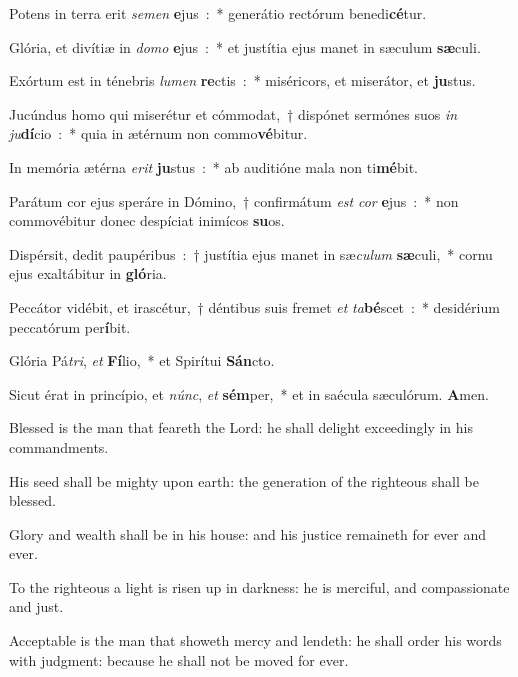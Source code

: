 \documentclass[letterpaper,12pt]{article} %
\begin{document}
\begin{multicols}{2}
\begin{psalmverses}[1]
\item Potens in terra erit\emph{ se}\emph{men}\textbf{ e}jus~:~* generátio rectórum benedi\textbf{cé}tur.
\item Glória, et divítiæ in\emph{ do}\emph{mo}\textbf{ e}jus~:~* et justítia ejus manet in sæculum\textbf{ sæ}culi.
\item Exórtum est in ténebris\emph{ lu}\emph{men}\textbf{ re}ctis~:~* miséricors, et miserátor, et\textbf{ ju}stus.
\item Jucúndus homo qui miserétur et cómmodat,~† dispónet sermónes suos\emph{ in}\emph{ ju}\textbf{dí}cio~:~* quia in ætérnum non commo\textbf{vé}bitur.
\item In memória ætérna\emph{ e}\emph{rit}\textbf{ ju}stus~:~* ab auditióne mala non ti\textbf{mé}bit.
\item Parátum cor ejus speráre in Dómino,~† confirmátum\emph{ est}\emph{ cor}\textbf{ e}jus~:~* non commovébitur donec despíciat inimícos\textbf{ su}os.
\item Dispérsit, dedit paupéribus~:~† justítia ejus manet in sæ\emph{cu}\emph{lum}\textbf{ sæ}culi,~* cornu ejus exaltábitur in\textbf{ gló}ria.
\item Peccátor vidébit, et irascétur,~† déntibus suis fremet\emph{ et}\emph{ ta}\textbf{bé}scet~:~* desidérium peccatórum per\textbf{í}bit.
\item Glória Pá\emph{tri},\emph{ et}\textbf{ Fí}lio,~* et Spirítui\textbf{ Sán}cto.
\item Sicut érat in princípio, et\emph{ núnc},\emph{ et}\textbf{ sém}per,~* et in saécula sæculórum.\textbf{ A}men.
\end{psalmverses}
\columnbreak
{}
\begin{psalmverses}[0]
\item Blessed is the man that feareth the Lord: he shall delight exceedingly in his commandments.
\item His seed shall be mighty upon earth: the generation of the righteous shall be blessed.
\item Glory and wealth shall be in his house: and his justice remaineth for ever and ever.
\item To the righteous a light is risen up in darkness: he is merciful, and compassionate and just.
\item Acceptable is the man that showeth mercy and lendeth: he shall order his words with judgment: because he shall not be moved for ever.

\end{psalmverses}
\end{multicols}
\end{document}
